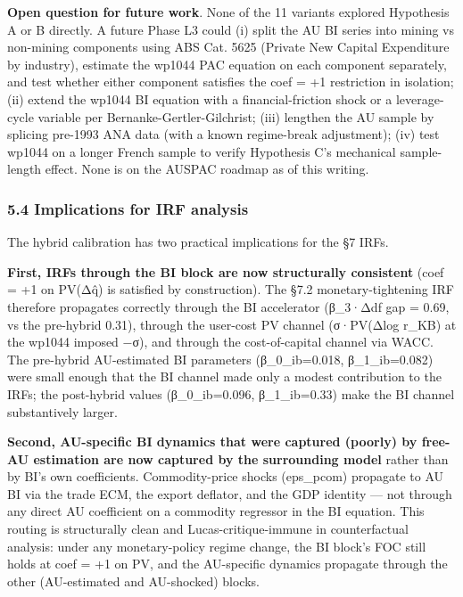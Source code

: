 \documentclass[
]{article}
\begin{document}
\textbf{Open question for future work}. None of the 11 variants explored
Hypothesis A or B directly. A future Phase L3 could (i) split the AU BI
series into mining vs non-mining components using ABS Cat. 5625 (Private
New Capital Expenditure by industry), estimate the wp1044 PAC equation
on each component separately, and test whether either component
satisfies the coef = +1 restriction in isolation; (ii) extend the wp1044
BI equation with a financial-friction shock or a leverage-cycle variable
per Bernanke-Gertler-Gilchrist; (iii) lengthen the AU sample by splicing
pre-1993 ANA data (with a known regime-break adjustment); (iv) test
wp1044 on a longer French sample to verify Hypothesis C's mechanical
sample-length effect. None is on the AUSPAC roadmap as of this writing.

\subsubsection{5.4 Implications for IRF
analysis}\label{implications-for-irf-analysis}

The hybrid calibration has two practical implications for the §7 IRFs.

\textbf{First, IRFs through the BI block are now structurally
consistent} (coef = +1 on PV(Δq̂) is satisfied by construction). The §7.2
monetary-tightening IRF therefore propagates correctly through the BI
accelerator (β\_3·Δdf gap = 0.69, vs the pre-hybrid 0.31), through the
user-cost PV channel (σ·PV(Δlog r\_KB) at the wp1044 imposed −σ), and
through the cost-of-capital channel via WACC. The pre-hybrid
AU-estimated BI parameters (β\_0\_ib=0.018, β\_1\_ib=0.082) were small
enough that the BI channel made only a modest contribution to the IRFs;
the post-hybrid values (β\_0\_ib=0.096, β\_1\_ib=0.33) make the BI
channel substantively larger.

\textbf{Second, AU-specific BI dynamics that were captured (poorly) by
free-AU estimation are now captured by the surrounding model} rather
than by BI's own coefficients. Commodity-price shocks (eps\_pcom)
propagate to AU BI via the trade ECM, the export deflator, and the GDP
identity --- not through any direct AU coefficient on a commodity
regressor in the BI equation. This routing is structurally clean and
Lucas-critique-immune in counterfactual analysis: under any
monetary-policy regime change, the BI block's FOC still holds at coef =
+1 on PV, and the AU-specific dynamics propagate through the other
(AU-estimated and AU-shocked) blocks.
\end{document}
